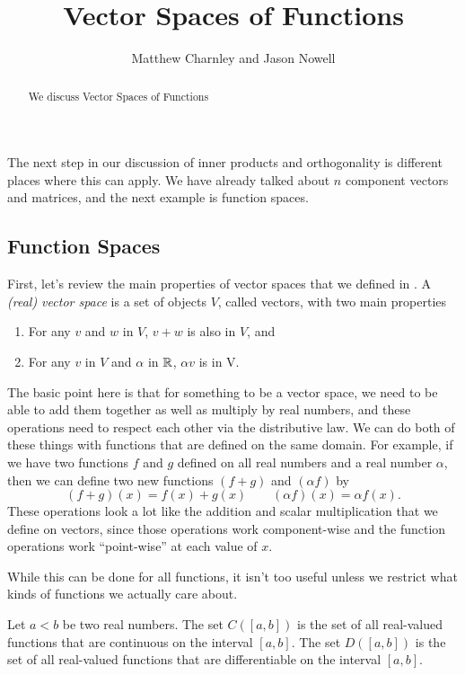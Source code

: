 \documentclass{ximera}
\title{Vector Spaces of Functions}
\author{Matthew Charnley and Jason Nowell}
\begin{document}
\begin{abstract}
    We discuss Vector Spaces of Functions
\end{abstract}
\maketitle

\label{functionVS:section}


The next step in our discussion of inner products and orthogonality is different places where this can apply. We have already talked about $n$ component vectors and matrices, and the next example is function spaces.

\subsection{Function Spaces}

First, let's review the main properties of vector spaces that we defined in . A \emph{(real) vector space} is a set of objects $V$, called vectors, with two main properties
\begin{enumerate}
    \item For any $v$ and $w$ in $V$, $v+w$ is also in $V$, and
    \item For any $v$ in $V$ and $\alpha$ in $\mathbb{R}$, $\alpha v$ is in V. 
\end{enumerate}
The basic point here is that for something to be a vector space, we need to be able to add them together as well as multiply by real numbers, and these operations need to respect each other via the distributive law. We can do both of these things with functions that are defined on the same domain. For example, if we have two functions $f$ and $g$ defined on all real numbers and a real number $\alpha$, then we can define two new functions $(f+g)$ and $(\alpha f)$ by
\[ 
    (f+g)(x) = f(x) + g(x) \qquad (\alpha f)(x) = \alpha f(x). 
\]
These operations look a lot like the addition and scalar multiplication that we define on vectors, since those operations work component-wise and the function operations work ``point-wise'' at each value of $x$. 

While this can be done for all functions, it isn't too useful unless we restrict what kinds of functions we actually care about. 

\begin{definition}
    Let $a < b$ be two real numbers. The set $C([a,b])$ is the set of all real-valued functions that are continuous on the interval $[a,b]$. The set $D([a,b])$ is the set of all real-valued functions that are differentiable on the interval $[a,b]$. 
\end{definition}
\end{document}
